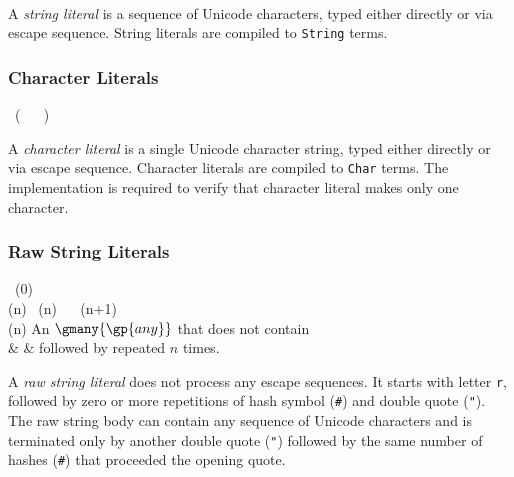 \begin{bnf}
   \eq {} \  \ 
\end{bnf}

A \emph{string literal} is a sequence of Unicode characters, typed either directly or via escape sequence. String literals are compiled to \lstinline{String} terms.

\subsubsection*{Character Literals}

\begin{bnf}
   \eq {} \ ( \  \gor {} \ ) \ 
\end{bnf}

A \emph{character literal} is a single Unicode character string, typed either directly or via escape sequence. Character literals are compiled to \lstinline{Char} terms. The implementation is required to verify that character literal makes only one character.

\subsubsection*{Raw String Literals}

\begin{bnf}
        \eq {} \ (0) \\
  (n)  \eq    {} \ (n) \ 
                      \gorln \term{\#} \ (n+1) \ \term{\#} \\
  (n) \eq \textnormal{An \(\gmany{\gp{any}}\) that does not contain} \\
                      & & \textnormal{ followed by \term{\#} repeated \(n\) times.}
\end{bnf}

A \emph{raw string literal} does not process any escape sequences. It starts with letter \texttt{r}, followed by zero or more repetitions of hash symbol (\texttt{\#}) and double quote (\texttt{"}). The raw string body can contain any sequence of Unicode characters and is terminated only by another double quote (\texttt{"}) followed by the same number of hashes (\texttt{\#}) that proceeded the opening quote.

